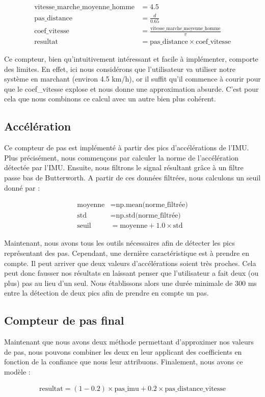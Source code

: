 \begin{align*}
\text{vitesse\_marche\_moyenne\_homme} &= 4.5 \\
\text{pas\_distance} &= \frac{d}{0.65} \\
\text{coef\_vitesse} &= \frac{\text{vitesse\_marche\_moyenne\_homme}}{v} \\
\text{resultat} &= \text{pas\_distance} \times \text{coef\_vitesse}
\end{align*}

Ce compteur, bien qu'intuitivement intéressant et facile à implémenter, comporte des limites. En effet, ici nous considérons que l'utilisateur va utiliser notre système en marchant (environ 4.5 km/h), or il suffit qu'il commence à courir pour que le coef\_vitesse explose et nous donne une approximation absurde. C'est pour cela que nous combinons ce calcul avec un autre bien plus cohérent. 

\subsection*{Accélération}

Ce compteur de pas est implémenté à partir des pics d'accélérations de l'IMU. Plus précisément, nous commençons par calculer la norme de l'accélération détectée par l'IMU. Ensuite, nous filtrons le signal résultant grâce à un filtre passe bas de Butterworth. A partir de ces données filtrées, nous calculons un seuil donné par :

\begin{align*}
\text{moyenne} &= \text{np.mean(norme\_filtrée)} \\
\text{std} &= \text{np.std(norme\_filtrée)} \\
\text{seuil} &= \text{moyenne} + 1.0 \times \text{std}
\end{align*}

Maintenant, nous avons tous les outils nécessaires afin de détecter les pics représentant des pas. Cependant, une dernière caractéristique est à prendre en compte. Il peut arriver que deux valeurs d'accélérations soient très proches. Cela peut donc fausser nos résultats en laissant penser que l'utilisateur a fait deux (ou  plus) pas au lieu d'un seul. Nous établissons alors une durée minimale de 300 ms entre la détection de deux pics afin de prendre en compte un pas.

\subsection*{Compteur de pas final}

Maintenant que nous avons deux méthode permettant d'approximer nos valeurs de pas, nous pouvons combiner les deux en leur applicant des coefficients en fonction de la confiance que nous leur attribuons. Finalement, nous avons ce modèle :

\begin{align*}
\text{resultat} = (1 - 0.2) \times \text{pas\_imu} + 0.2 \times \text{pas\_distance\_vitesse}
\end{align*}

